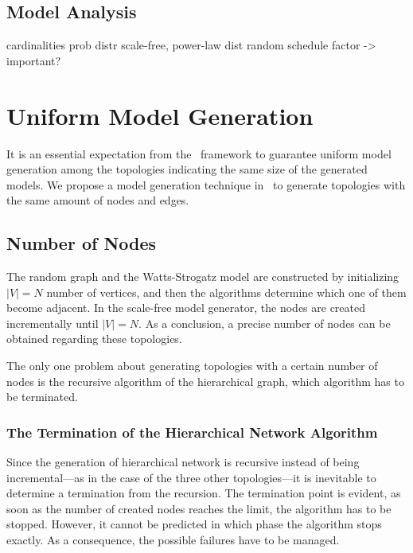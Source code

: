 \subsection{Model Analysis}\label{sec:model_analysis}
cardinalities
prob distr
scale-free, power-law dist
random schedule factor -> important?

\section{Uniform Model Generation}

It is an essential expectation from the \framework~framework to guarantee uniform model generation among the topologies indicating the same size of the generated models. We propose a model generation technique in \framework~to generate topologies with the same amount of nodes and edges.

\subsection{Number of Nodes}

The random graph and the Watts-Strogatz model are constructed by initializing $|V| = N$ number of vertices, and then the algorithms determine which one of them become adjacent. In the scale-free model generator, the nodes are created incrementally until $|V| = N$. As a conclusion, a precise number of nodes can be obtained regarding these topologies.

The only one problem about generating topologies with a certain number of nodes is the recursive algorithm of the hierarchical graph, which algorithm has to be terminated.

\subsubsection{The Termination of the Hierarchical Network Algorithm}\label{sec:hierarcical_contribution}

Since the generation of hierarchical network is recursive instead of being incremental---as in the case of the three other topologies---it is inevitable to determine a termination from the recursion. The termination point is evident, as soon as the number of created nodes reaches the limit, the algorithm has to be stopped. However, it cannot be predicted in which phase the algorithm stops exactly. As a consequence, the possible failures have to be managed.

